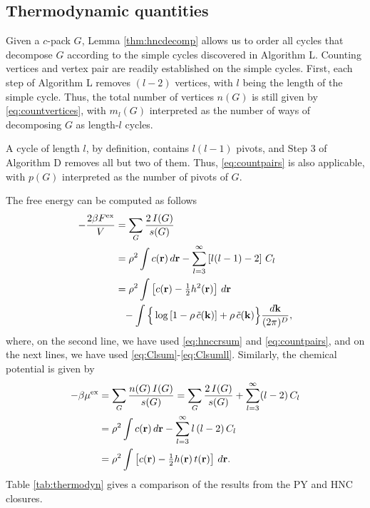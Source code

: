 \documentclass[aip,jcp,reprint,superscriptaddress]{revtex4-1}
\newcommand{\vct}[1]{\mathbf{#1}}
\providecommand{\vr}{} %
\renewcommand{\vr}{\vct{r}}
\newcommand{\vk}{\vct{k}}
\newcommand{\dvk}{\frac{d\vk}{(2\pi)^D}}
\newcommand{\supex}[1]{ { { #1 }^{ \mathrm{ex} } } }
\newcommand{\Fex}{\supex{F}}
\newcommand{\muex}{\supex{\mu}}
\begin{document}
\subsection*{Thermodynamic quantities}


Given a $c$-pack $G$,
  Lemma \ref{thm:hncdecomp} allows us
  to order all cycles that decompose $G$
  according to the simple cycles
  discovered in Algorithm L.
%
Counting vertices and vertex pair
  are readily established on the simple cycles.
%
First, each step of Algorithm L removes $(l - 2)$ vertices,
  with $l$ being the length of the simple cycle.
%
Thus, the total number of vertices $n(G)$
  is still given by \eqref{eq:countvertices},
  with $m_l(G)$ interpreted as
  the number of ways
  of decomposing $G$ as length-$l$ cycles.

A cycle of length $l$, by definition,
  contains $l (l - 1)$ pivots,
  and Step 3 of Algorithm D
  removes all but two of them.
%
Thus, \eqref{eq:countpairs}
  is also applicable, with $p(G)$ interpreted
  as the number of pivots of $G$.



The free energy can be computed
  as follows\cite{morita1958, *morita1959, *morita1960, singer1985}
%
\begin{align}
    - \frac{ 2 \beta \Fex } { V }
  &=
      \sum_G \frac{ 2 \, I(G) } { s(G) }
      \notag \\
  &=
      \rho^2 \int c(\vr) \, d\vr
    - \sum_{l = 3}^\infty \left[ l(l-1) - 2 \right] \, C_l
      \notag \\
  &=
      \rho^2 \int \left[ c(\vr) - \tfrac{1}{2} h^2(\vr) \right] \, d\vr
      \notag \\
  & \hphantom{=}
    - \int  \Big\{
              \log\left[ 1 - \rho \, \tilde{c}(\vk) \right]
                           + \rho \, \tilde{c}(\vk)
            \Big\}  \dvk,
\label{eq:hncF}
\end{align}
%
where,
  on the second line,
  we have used \eqref{eq:hnccrsum} and \eqref{eq:countpairs},
  and on the next lines,
  we have used \eqref{eq:Clsum}-\eqref{eq:Clsumll}.
%
Similarly, the chemical potential
  is given by\cite{morita1958, *morita1959, *morita1960, singer1985}
%
\begin{align}
    - \beta \muex
  &=
      \sum_G \frac{ n(G) \, I(G) } { s(G) }
  =
      \sum_G \frac{ 2 \, I(G) } { s(G) }
    + \sum_{l = 3}^\infty (l-2) \, C_l
      \notag \\
  &=
      \rho^2 \int c(\vr) \, d\vr
    - \sum_{l = 3}^\infty l \, (l-2) \, C_l
      \notag \\
  &=
      \rho^2 \int \left[ c(\vr) - \tfrac{1}{2} h(\vr) \, t(\vr) \right] \, d\vr.
\label{eq:hncmu}
\end{align}
%
Table \ref{tab:thermodyn} gives
  a comparison of the results from the PY and HNC closures.




\end{document}
